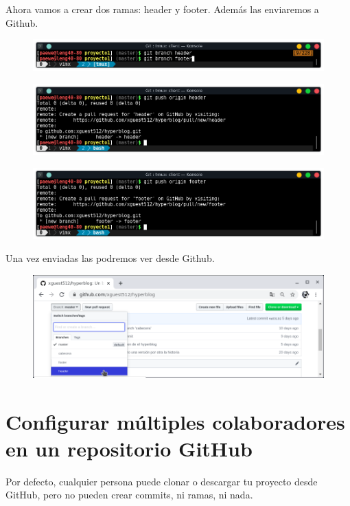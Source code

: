 \documentclass{article}
\begin{document}
Ahora vamos a crear dos ramas: header y footer. Además las enviaremos a Github.

\begin{figure}[h!]
  \centering
  \includegraphics[scale=0.75]{./Pictures/252_new_branches.png}
\end{figure}

\begin{figure}[h!]
  \centering
  \includegraphics[scale=0.75]{./Pictures/253_push_header.png}
\end{figure}

\begin{figure}[h!]
  \centering
  \includegraphics[scale=0.75]{./Pictures/254_push_footer.png}
\end{figure}

Una vez enviadas las podremos ver desde Github.

\begin{figure}[h!]
  \centering
  \includegraphics[scale=0.75]{./Pictures/255_branches_github.png}
\end{figure}


\newpage
\section{Configurar múltiples colaboradores en un repositorio GitHub}%
Por defecto, cualquier persona puede clonar o descargar tu proyecto desde
GitHub, pero no pueden crear commits, ni ramas, ni nada.\\
\end{document}
